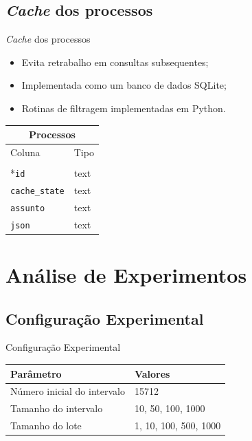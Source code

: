 \subsection{\textit{Cache} dos processos}

\begin{frame}{\textit{Cache} dos processos}
    \begin{itemize}
        \item Evita retrabalho em consultas subsequentes;
        \item Implementada como um banco de dados SQLite;
        \item Rotinas de filtragem implementadas em Python.
    \end{itemize}

    \begin{table}[H]
        \centering
        \small
        \begin{tabular}{ll}
            \toprule
            \multicolumn{2}{c}{Processos} \\
            \midrule
            Coluna & Tipo \\
            \midrule \\
            *\texttt{id} & text \\
            \texttt{cache\_state} & text \\
            \texttt{assunto} & text \\
            \texttt{json} & text \\
            \bottomrule
        \end{tabular}
    \end{table}
\end{frame}

\section{Análise de Experimentos}

\subsection{Configuração Experimental}

\begin{frame}{Configuração Experimental}
    \begin{table}[htb]
      \centering
      \begin{tabular}{ll}
        \toprule
        Parâmetro & Valores \\
        \midrule
        Número inicial do intervalo & 15712 \\
        Tamanho do intervalo & 10, 50, 100, 1000 \\
        Tamanho do lote & 1, 10, 100, 500, 1000 \\
        \bottomrule
      \end{tabular}
    \end{table}
\end{frame}

